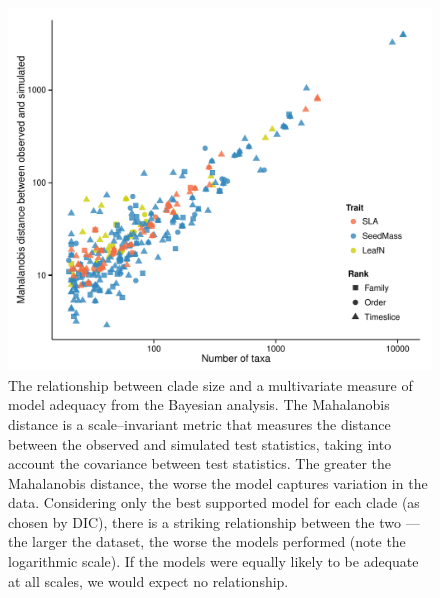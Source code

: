 \documentclass[a4paper,11pt]{article}
\begin{document}
{\begin{figure}[p]
  \centering
  \includegraphics[scale=0.8]{figs/ad-size-bayes}
  \caption{The relationship between clade size and a multivariate measure of model adequacy from the Bayesian analysis. The Mahalanobis distance is a scale--invariant metric that measures the distance between the observed and simulated test statistics, taking into account the covariance between test statistics. The greater the Mahalanobis distance, the worse the model captures variation in the data. Considering only the best supported model for each clade (as chosen by DIC), there is a striking relationship between the two --- the larger the dataset, the worse the models performed (note the logarithmic scale). If the models were equally likely to be adequate at all scales, we would expect no relationship.}
  \label{fig:supp-size-adequacy}
\end{figure}

}
\end{document}
